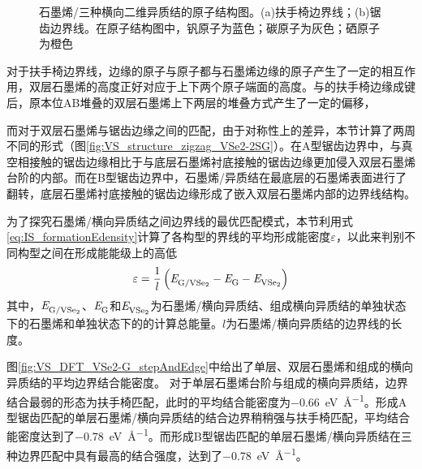 \begin{figure}[htb]
{            \label{fig:VS_structure_zigzag_VSe2-2SG}
        }
        \caption{石墨烯/三种横向二维异质结的原子结构图。(a)扶手椅边界线；(b)锯齿边界线。在原子结构图中，钒原子为蓝色；碳原子为灰色；硒原子为橙色}
        \label{fig:VS_structure_ac_zz}
    \end{figure}
    
    对于扶手椅边界线，边缘的原子与原子都与石墨烯边缘的原子产生了一定的相互作用，双层石墨烯的高度正好对应于上下两个原子端面的高度。与的扶手椅边缘成键后，原本位AB堆叠的双层石墨烯上下两层的堆叠方式产生了一定的偏移，

    而对于双层石墨烯与锯齿边缘之间的匹配，由于对称性上的差异，本节计算了两周不同的形式（图\ref{fig:VS_structure_zigzag_VSe2-2SG}）。在A型锯齿边界中，与真空相接触的锯齿边缘相比于与底层石墨烯衬底接触的锯齿边缘更加侵入双层石墨烯台阶的内部。而在B型锯齿边界中，石墨烯/异质结在最底层的石墨烯表面进行了翻转，底层石墨烯衬底接触的锯齿边缘形成了嵌入双层石墨烯内部的边界线结构。

    为了探究石墨烯/横向异质结之间边界线的最优匹配模式，本节利用式\eqref{eq:IS_formationEdensity}计算了各构型的界线的平均形成能密度$\varepsilon$，以此来判别不同构型之间在形成能能级上的高低\chinesecolon
    \begin{equation}
        \label{eq:IS_formationEdensity}
        \varepsilon = \frac{1}{l} \left( \energyVar{G/\ce{VSe2}}{} -\energyVar{G}{} -\energyVar{\ce{VSe2}}{} \right)
    \end{equation}
    其中，$\energyVar{G/\ce{VSe2}}{}$、$\it E_{\rm G}^{\rm } \it$和$\energyVar{\ce{VSe2}}{}$为石墨烯/横向异质结、组成横向异质结的单独状态下的石墨烯和单独状态下的的计算总能量。$l$为石墨烯/横向异质结的边界线的长度。
    
    图\ref{fig:VS_DFT_VSe2-G_stepAndEdge}中给出了单层、双层石墨烯和组成的横向异质结的平均边界结合能密度。
    对于单层石墨烯台阶与组成的横向异质结，边界结合最弱的形态为扶手椅匹配，此时的平均结合能密度为\SI{-0.66}{\electronvolt\per\angstrom}。形成A型锯齿匹配的单层石墨烯/横向异质结的结合边界稍稍强与扶手椅匹配，平均结合能密度达到了\SI{-0.78}{\electronvolt\per\angstrom}。而形成B型锯齿匹配的单层石墨烯/横向异质结在三种边界匹配中具有最高的结合强度，达到了\SI{-0.78}{\electronvolt\per\angstrom}。

